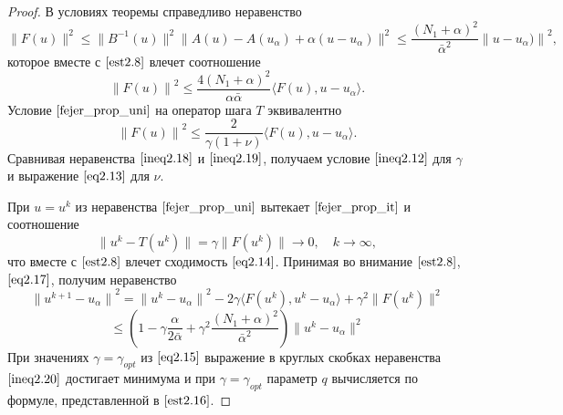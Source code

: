 \begin{proof}
В условиях теоремы справедливо неравенство
\begin{equation}\label{eq2.17}
\|F(u)\|^2\le\|B^{-1}(u)\|^2\|A(u)-A(u_\alpha)+\alpha(u-u_\alpha)\|^2 \le \frac{(N_1+\alpha)^2}{\bar\alpha^2}{\|u-u_\alpha)\|}^2,
\end{equation}
которое вместе с $\eqref{est2.8}$ влечет соотношение
\begin{equation}\label{ineq2.18}
{\|F(u)\|}^2 \le \frac{4(N_1+\alpha)^2}{\alpha\bar\alpha}\langle F(u), u-u_\alpha\rangle.
\end{equation}
Условие $\eqref{fejer_prop_uni}$ на оператор шага $T$ эквивалентно 
\begin{equation}\label{ineq2.19}
{\|F(u)\|}^2 \le \frac{2}{\gamma(1+\nu)}\langle F(u), u-u_\alpha\rangle.
\end{equation}
Сравнивая неравенства $\eqref{ineq2.18}$ и $\eqref{ineq2.19}$, получаем условие $\eqref{ineq2.12}$ для $\gamma$ и выражение $\eqref{eq2.13}$ для $\nu$.

При $u=u^k$ из неравенства $\eqref{fejer_prop_uni}$ вытекает $\eqref{fejer_prop_it}$ и соотношение
$$ \|u^k-T(u^k)\|=\gamma\|F(u^k)\|\to 0, \quad k\to\infty,$$ что вместе с $\eqref{est2.8}$ влечет сходимость $\eqref{eq2.14}$.
Принимая во внимание $\eqref{est2.8}$, $\eqref{eq2.17}$, получим неравенство
$$ {\|u^{k+1}-u_\alpha\|}^2={\|u^k-u_\alpha\|}^2-2\gamma\langle F(u^k), u^k-u_\alpha\rangle+{\gamma}^2\|F(u^k)\|^2 $$
\begin{equation}\label{ineq2.20}
\le \left (1-\gamma\frac{\alpha}{2\bar\alpha}+{\gamma}^2\frac{(N_1+\alpha)^2}{{\bar\alpha}^2}\right )\|u^k-u_\alpha\|^2
\end{equation}
При значениях $\gamma={\gamma}_{opt}$ из $\eqref{eq2.15}$ выражение в круглых скобках неравенства $\eqref{ineq2.20}$ достигает минимума и при $\gamma={\gamma}_{opt}$ параметр $q$ вычисляется по формуле, представленной в $\eqref{est2.16}$.
\end{proof}

\newpage
